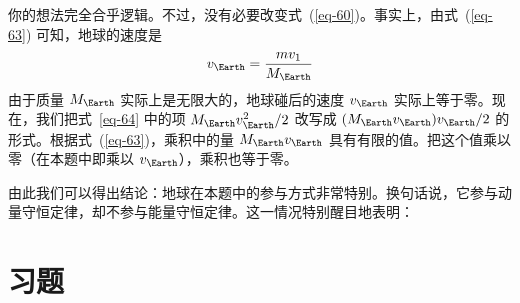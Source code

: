 \begin{dialogue}
\tchr 你的想法完全合乎逻辑。不过，没有必要改变式~(\ref{eq-60})。事实上，由式~(\ref{eq-63}) 可知，地球的速度是
\begin{equation*}
v_{\Earth} = \frac{mv_{1}}{M_{\Earth}}
\end{equation*}
由于质量 $M_{\Earth}$ 实际上是无限大的，地球碰后的速度 $v_{\Earth}$ 实际上等于零。现在，我们把式~\eqref{eq-64} 中的项 $M_{\Earth}v_{\Earth}^{2}/2$ 改写成 $(M_{\Earth}v_{\Earth})v_{\Earth}/2$ 的形式。根据式~(\ref{eq-63})，乘积中的量 $M_{\Earth}v_{\Earth}$ 具有有限的值。把这个值乘以零（在本题中即乘以 $v_{\Earth}$），乘积也等于零。

由此我们可以得出结论：地球在本题中的参与方式非常特别。换句话说，它参与动量守恒定律，却不参与能量守恒定律。这一情况特别醒目地表明：
\end{dialogue}
\section*{习题}
\label{prob-10}

